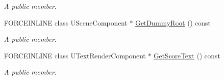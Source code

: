 \begin{DoxyCompactItemize}
\begin{DoxyCompactList}\small\item\em A public member. \end{DoxyCompactList}\item 
F\+O\+R\+C\+E\+I\+N\+L\+I\+NE class U\+Scene\+Component $\ast$ \hyperlink{class_a_unreal_grid_adc32753015f3681249c9effd0babf72d}{Get\+Dummy\+Root} () const
\begin{DoxyCompactList}\small\item\em A public member. \end{DoxyCompactList}\item 
F\+O\+R\+C\+E\+I\+N\+L\+I\+NE class U\+Text\+Render\+Component $\ast$ \hyperlink{class_a_unreal_grid_a2b699473afc36a77c3719002ae37bd9d}{Get\+Score\+Text} () const
\begin{DoxyCompactList}\small\item\em A public member. \end{DoxyCompactList}\end{DoxyCompactItemize}
